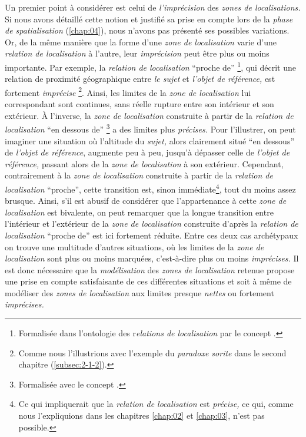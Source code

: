 Un premier point à considérer est celui de \emph{l'imprécision} des
\emph{zones de localisations.} Si nous avons détaillé cette notion et
justifié sa prise en compte lors de la \emph{phase de spatialisation}
(\autoref{chap:04}), nous n'avons pas présenté ses possibles
variations. Or, de la même manière que la forme d'une \emph{zone de
  localisation} varie d'une \emph{relation de localisation} à l'autre,
leur \emph{imprécision} peut être plus ou moins importante. Par
exemple, la \emph{relation de localisation} \enquote{proche de}
\footnote{Formalisée dans l'ontologie des r\emph{elations de
    localisation} par le concept .}, qui décrit
une relation de proximité géographique entre \emph{le sujet} et
\emph{l'objet de référence,} est fortement \emph{imprécise}
\footnote{Comme nous l'illustrions avec l'exemple du \emph{paradoxe
    sorite} dans le second chapitre (\autoref{subsec:2-1-2}).}. Ainsi,
les limites de la \emph{zone de localisation} lui correspondant sont
continues, sans réelle rupture entre son intérieur et son extérieur. À
l'inverse, la \emph{zone de localisation} construite à partir de la
\emph{relation de localisation} \enquote{en dessous de}
\footnote{Formalisée avec le concept
  .} a des limites plus
\emph{précises.} Pour l'illustrer, on peut imaginer une situation où
l'altitude du \emph{sujet,} alors clairement situé \enquote{en
  dessous} de \emph{l'objet de référence}, augmente peu à peu, jusqu'à
dépasser celle de \emph{l'objet de référence,} passant alors de la
\emph{zone de localisation} à son extérieur. Cependant, contrairement
à la \emph{zone de localisation} construite à partir de la
\emph{relation de localisation} \enquote{proche}, cette transition
est, sinon immédiate\footnote{Ce qui impliquerait que la
  \emph{relation de localisation} est \emph{précise,} ce qui, comme
  nous l'expliquions dans les chapitres \ref{chap:02} et
  \ref{chap:03}, n'est pas possible.}, tout du moins assez
brusque. Ainsi, s'il est abusif de considérer que l'appartenance à
cette \emph{zone de localisation} est bivalente, on peut remarquer que
la longue transition entre l'intérieur et l'extérieur de la \emph{zone
  de localisation} construite d'après la \emph{relation de
  localisation} \enquote{proche de} est ici fortement réduite. Entre
ces deux cas archétypaux on trouve une multitude d'autres situations,
où les limites de la \emph{zone de localisation} sont plus ou moins
marquées, c'est-à-dire plus ou moins \emph{imprécises.} Il est donc
nécessaire que la \emph{modélisation} des \emph{zones de localisation}
retenue propose une prise en compte satisfaisante de ces différentes
situations et soit à même de modéliser des \emph{zones de
  localisation} aux limites presque \emph{nettes} ou fortement
\emph{imprécises.}

